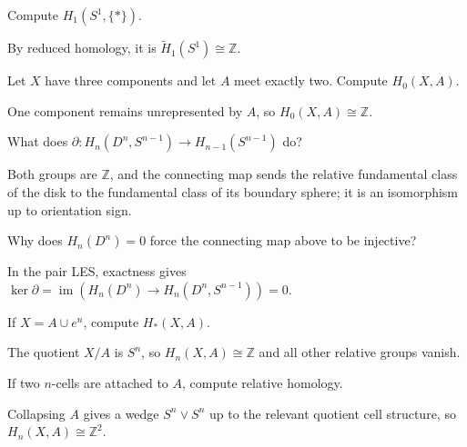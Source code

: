 \begin{problem}\label{prob:viii19-04}
Compute \(H_1(S^1,\{*\})\).
\end{problem}
\begin{solution}
By reduced homology, it is \(\widetilde H_1(S^1)\cong\mathbb Z\).
\end{solution}

\begin{problem}[Relative \(H_0\)]\label{prob:viii19-05}
Let \(X\) have three components and let \(A\) meet exactly two. Compute \(H_0(X,A)\).
\end{problem}
\begin{solution}
One component remains unrepresented by \(A\), so \(H_0(X,A)\cong\mathbb Z\).
\end{solution}

\begin{problem}\label{prob:viii19-06}
What does \(\partial:H_n(D^n,S^{n-1})\to H_{n-1}(S^{n-1})\) do?
\end{problem}
\begin{solution}
Both groups are \(\mathbb Z\), and the connecting map sends the relative fundamental class of the disk to the fundamental class of its boundary sphere; it is an isomorphism up to orientation sign.
\end{solution}

\begin{problem}\label{prob:viii19-07}
Why does \(H_n(D^n)=0\) force the connecting map above to be injective?
\end{problem}
\begin{solution}
In the pair LES, exactness gives \(\ker\partial=\operatorname{im}(H_n(D^n)\to H_n(D^n,S^{n-1}))=0\).
\end{solution}

\begin{problem}\label{prob:viii19-08}
If \(X=A\cup e^n\), compute \(H_*(X,A)\).
\end{problem}
\begin{solution}
The quotient \(X/A\) is \(S^n\), so \(H_n(X,A)\cong\mathbb Z\) and all other relative groups vanish.
\end{solution}

\begin{problem}\label{prob:viii19-09}
If two \(n\)-cells are attached to \(A\), compute relative homology.
\end{problem}
\begin{solution}
Collapsing \(A\) gives a wedge \(S^n\vee S^n\) up to the relevant quotient cell structure, so \(H_n(X,A)\cong\mathbb Z^2\).
\end{solution}

